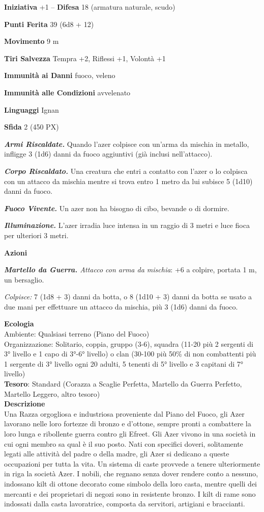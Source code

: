 \begin{multicols}{2}
	\textbf{Iniziativa} +1 -- \textbf{Difesa} 18 (armatura naturale, scudo)

	\textbf{Punti Ferita} 39 (6d8 + 12)

	\textbf{Movimento} 9 m

	\textbf{Tiri Salvezza} Tempra +2, Riflessi +1, Volontà +1

	\textbf{Immunità ai Danni} fuoco, veleno

	\textbf{Immunità alle Condizioni} avvelenato

	\textbf{Linguaggi} Ignan

	\textbf{Sfida} 2 (450 PX)

	\textit{\textbf{Armi Riscaldate.}} Quando l'azer colpisce con un'arma da mischia in metallo, infligge 3 (1d6) danni da fuoco aggiuntivi (già inclusi nell'attacco).

	\textit{\textbf{Corpo Riscaldato.}} Una creatura che entri a contatto con l'azer o lo colpisca con un attacco da mischia mentre si trova entro 1 metro da lui subisce 5 (1d10) danni da fuoco.

	\textit{\textbf{Fuoco Vivente.}} Un azer non ha bisogno di cibo, bevande o di dormire.

	\textit{\textbf{Illuminazione.}} L'azer irradia luce intensa in un raggio di 3 metri e luce fioca per ulteriori 3 metri.

	\textbf{Azioni}

	\textit{\textbf{Martello da Guerra.} Attacco con arma da mischia}: +6 a colpire, portata 1 m, un bersaglio.

	\textit{Colpisce:} 7 (1d8 + 3) danni da botta, o 8 (1d10 + 3) danni da botta se usato a due mani per effettuare un attacco da mischia, più 3 (1d6) danni da fuoco.

	\textbf{Ecologia}\\
	Ambiente: Qualsiasi terreno (Piano del Fuoco)\\
	Organizzazione: Solitario, coppia, gruppo (3-6), squadra (11-20 più 2 sergenti di 3° livello e 1 capo di 3°-6° livello) o clan (30-100 più 50\% di non combattenti più 1 sergente di 3° livello ogni 20 adulti, 5 tenenti di 5° livello e 3 capitani di 7° livello)\\
	\textbf{Tesoro}: Standard (Corazza a Scaglie Perfetta, Martello da Guerra Perfetto, Martello Leggero, altro tesoro)\\
	\textbf{Descrizione}\\
	Una Razza orgogliosa e industriosa proveniente dal Piano del Fuoco, gli Azer lavorano nelle loro fortezze di bronzo e d'ottone, sempre pronti a combattere la loro lunga e ribollente guerra contro gli Efreet. Gli Azer vivono in una società in cui ogni membro sa qual è il suo posto. Nati con specifici doveri, solitamente legati alle attività del padre o della madre, gli Azer si dedicano a queste occupazioni per tutta la vita. Un sistema di caste provvede a tenere ulteriormente in riga la società Azer. I nobili, che regnano senza dover rendere conto a nessuno, indossano kilt di ottone decorato come simbolo della loro casta, mentre quelli dei mercanti e dei proprietari di negozi sono in resistente bronzo. I kilt di rame sono indossati dalla casta lavoratrice, composta da servitori, artigiani e braccianti.


\end{multicols}
